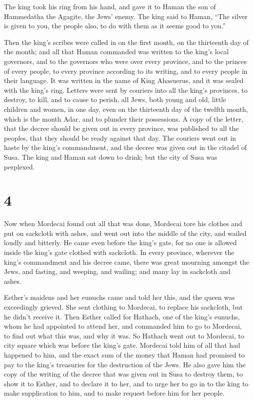  The king took his ring from his hand, and gave it to Haman
the son of Hammedatha the Agagite, the Jews' enemy.  The
king said to Haman, ``The silver is given to you, the people also, to do
with them as it seems good to you.''

 Then the king's scribes were called in on the first month,
on the thirteenth day of the month; and all that Haman commanded was
written to the king's local governors, and to the governors who were
over every province, and to the princes of every people, to every
province according to its writing, and to every people in their
language. It was written in the name of King Ahasuerus, and it was
sealed with the king's ring.  Letters were sent by couriers
into all the king's provinces, to destroy, to kill, and to cause to
perish, all Jews, both young and old, little children and women, in one
day, even on the thirteenth day of the twelfth month, which is the month
Adar, and to plunder their possessions.  A copy of the
letter, that the decree should be given out in every province, was
published to all the peoples, that they should be ready against that
day.  The couriers went out in haste by the king's
commandment, and the decree was given out in the citadel of Susa. The
king and Haman sat down to drink; but the city of Susa was perplexed.

\hypertarget{section-3}{%
\section{4}\label{section-3}}

 Now when Mordecai found out all that was done, Mordecai
tore his clothes and put on sackcloth with ashes, and went out into the
middle of the city, and wailed loudly and bitterly.  He came
even before the king's gate, for no one is allowed inside the king's
gate clothed with sackcloth.  In every province, wherever
the king's commandment and his decree came, there was great mourning
amongst the Jews, and fasting, and weeping, and wailing; and many lay in
sackcloth and ashes.

 Esther's maidens and her eunuchs came and told her this,
and the queen was exceedingly grieved. She sent clothing to Mordecai, to
replace his sackcloth, but he didn't receive it.  Then
Esther called for Hathach, one of the king's eunuchs, whom he had
appointed to attend her, and commanded him to go to Mordecai, to find
out what this was, and why it was.  So Hathach went out to
Mordecai, to city square which was before the king's gate. 
Mordecai told him of all that had happened to him, and the exact sum of
the money that Haman had promised to pay to the king's treasuries for
the destruction of the Jews.  He also gave him the copy of
the writing of the decree that was given out in Susa to destroy them, to
show it to Esther, and to declare it to her, and to urge her to go in to
the king to make supplication to him, and to make request before him for
her people.

